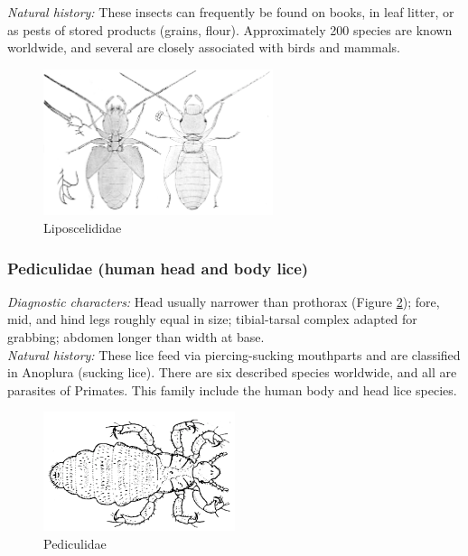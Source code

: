\documentclass[letterpaper, 11pt]{article}
\begin{document}
\noindent{}\textit{Natural history:} These insects can frequently be found on books, in leaf litter, or as pests of stored products (grains, flour). Approximately 200 species are known worldwide, and several are closely associated with birds and mammals.\\

\begin{figure}[ht!]
 \centering
 \includegraphics[width=0.6\textwidth]{liposcelidid.png}
 \caption{Liposcelididae \citep[][Fig. 34]{Howard029686434}}
 \label{fig:liposcelidid}
\end{figure}

\subsubsection{Pediculidae (human head and body lice)}
\noindent{}\textit{Diagnostic characters:} Head usually narrower than prothorax (Figure \ref{fig:pediculid}); fore, mid, and hind legs roughly equal in size; tibial-tarsal complex adapted for grabbing; abdomen longer than width at base.\\

\noindent{}\textit{Natural history:} These lice feed via piercing-sucking mouthparts and are classified in Anoplura (sucking lice). There are six described species worldwide, and all are parasites of Primates. This family include the human body and head lice species.\\

\begin{figure}[ht!]
 \centering
 \includegraphics[width=0.5\textwidth]{Pediculidae.png}
 \caption{Pediculidae \citep[][Fig. 13A]{snodgrass1944feeding}}
 \label{fig:pediculid}
\end{figure}
\end{document}

